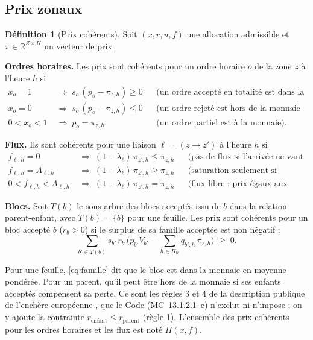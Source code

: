 \documentclass[a4paper,12pt]{article}
\theoremstyle{definition}
\newtheorem{definition}{Définition}
\newcommand{\MC}[1]{MC~#1}
\begin{document}
\subsection{Prix zonaux}

\begin{definition}[Prix cohérents]\label{def:coherent}
Soit $(x,r,u,f)$ une allocation admissible et $\pi\in\mathbb R^{Z\times H}$ un vecteur de prix.

\medskip
\noindent\textbf{Ordres horaires.} Les prix sont cohérents pour un ordre horaire $o$ de la zone $z$ à l'heure $h$ si
\begin{align*}
x_o = 1 &\;\Rightarrow\; s_o\,(p_o-\pi_{z,h})\ge 0 && \text{(un ordre accepté en totalité est dans la monnaie ou à la monnaie)}\\
x_o = 0 &\;\Rightarrow\; s_o\,(p_o-\pi_{z,h})\le 0 && \text{(un ordre rejeté est hors de la monnaie ou à la monnaie)}\\
0<x_o<1 &\;\Rightarrow\; p_o=\pi_{z,h} && \text{(un ordre partiel est à la monnaie).}
\end{align*}

\noindent\textbf{Flux.} Ils sont cohérents pour une liaison $\ell=(z\to z')$ à l'heure $h$ si
\begin{align*}
f_{\ell,h}=0 &\;\Rightarrow\; (1-\lambda_\ell)\,\pi_{z',h}\le\pi_{z,h} && \text{(pas de flux si l'arrivée ne vaut pas le départ)}\\
f_{\ell,h}=A_{\ell,h} &\;\Rightarrow\; (1-\lambda_\ell)\,\pi_{z',h}\ge\pi_{z,h} && \text{(saturation seulement si l'arrivée vaut plus)}\\
0<f_{\ell,h}<A_{\ell,h} &\;\Rightarrow\; (1-\lambda_\ell)\,\pi_{z',h}=\pi_{z,h} && \text{(flux libre : prix égaux aux pertes près).}
\end{align*}

\noindent\textbf{Blocs.} Soit $T(b)$ le sous-arbre des blocs acceptés issu de $b$ dans la relation parent-enfant, avec $T(b)=\{b\}$ pour une feuille. Les prix sont cohérents pour un bloc accepté $b$ ($r_b>0$) si le surplus de sa famille acceptée est non négatif :
\begin{equation}\label{eq:famille}
\sum_{b'\in T(b)} s_{b'}\,r_{b'}\Big(p_{b'}V_{b'}-\sum_{h\in H_{b'}}q_{b',h}\,\pi_{z,h}\Big)\;\ge\;0 .
\end{equation}

\noindent Pour une feuille, \eqref{eq:famille} dit que le bloc est dans la monnaie en moyenne pondérée. Pour un parent, qu'il peut être hors de la monnaie si ses enfants acceptés compensent sa perte. Ce sont les règles 3 et 4 de la description publique de l'enchère européenne \citep{euphemia2025}, que le Code (\MC{13.1.2.1}~c) n'exclut ni n'impose ; on y ajoute la contrainte $r_{\text{enfant}}\le r_{\text{parent}}$ (règle 1). L'ensemble des prix cohérents pour les ordres horaires et les flux est noté $\Pi(x,f)$.
\end{definition}
\end{document}
